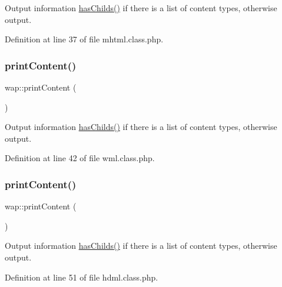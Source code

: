 Output information \hyperlink{classmobileXE_a680f6a6b774bf12be4c67b6a9215f1ea}{has\+Childs()} if there is a list of content types, otherwise output. 



Definition at line 37 of file mhtml.\+class.\+php.

\hypertarget{classwap_a1edebe2b6a90ec08ab149ad2b2866dbd}{}\label{classwap_a1edebe2b6a90ec08ab149ad2b2866dbd} 
\subsubsection{\texorpdfstring{print\+Content()}{printContent()}\hspace{0.1cm}{\footnotesize\ttfamily [2/3]}}
{\footnotesize\ttfamily wap\+::print\+Content (\begin{DoxyParamCaption}{ }\end{DoxyParamCaption})}



Output information \hyperlink{classmobileXE_a680f6a6b774bf12be4c67b6a9215f1ea}{has\+Childs()} if there is a list of content types, otherwise output. 



Definition at line 42 of file wml.\+class.\+php.

\hypertarget{classwap_a1edebe2b6a90ec08ab149ad2b2866dbd}{}\label{classwap_a1edebe2b6a90ec08ab149ad2b2866dbd} 
\subsubsection{\texorpdfstring{print\+Content()}{printContent()}\hspace{0.1cm}{\footnotesize\ttfamily [3/3]}}
{\footnotesize\ttfamily wap\+::print\+Content (\begin{DoxyParamCaption}{ }\end{DoxyParamCaption})}



Output information \hyperlink{classmobileXE_a680f6a6b774bf12be4c67b6a9215f1ea}{has\+Childs()} if there is a list of content types, otherwise output. 



Definition at line 51 of file hdml.\+class.\+php.

\hypertarget{classwap_a1fd1c1dca866c9b6653499cabf124980}{}\label{classwap_a1fd1c1dca866c9b6653499cabf124980} 
